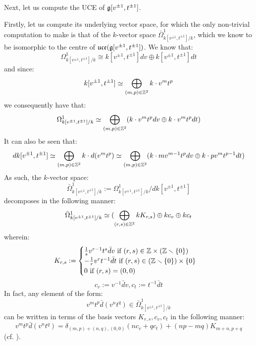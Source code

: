         \begin{example} \label{example: toroidal_lie_algebras_centres}
            Next, let us compute the UCE of $\mathfrak{g}[v^{\pm 1}, t^{\pm 1}]$. 
            
            Firstly, let us compute its underlying vector space, for which the only non-trivial computation to make is that of the $k$-vector space $\bar{\Omega}^1_{k[v^{\pm 1}, t^{\pm 1}]/k}$, which we know to be isomorphic to the centre of $\mathfrak{uce}(\mathfrak{g}[v^{\pm 1}, t^{\pm 1}])$. We know that:
                $$\Omega^1_{k[v^{\pm 1}, t^{\pm 1}]/k} \cong k[v^{\pm 1}, t^{\pm 1}] dv \oplus k[v^{\pm 1}, t^{\pm 1}] dt$$
            and since:
                $$k[v^{\pm 1}, t^{\pm 1}] \simeq \bigoplus_{(m, p) \in \mathbb{Z}^2} k \cdot v^m t^p$$
            we consequently have that:
                $$\Omega^1_{k[v^{\pm 1}, t^{\pm 1}]/k} \simeq \bigoplus_{(m, p) \in \mathbb{Z}^2} (k \cdot v^m t^p dv \oplus k \cdot v^m t^p dt)$$
            It can also be seen that:
                $$d k[v^{\pm 1}, t^{\pm 1}] \simeq \bigoplus_{(m, p) \in \mathbb{Z}^2} k \cdot d(v^m t^p) \simeq \bigoplus_{(m, p) \in \mathbb{Z}^2} ( k \cdot m v^{m - 1} t^p dv \oplus k \cdot p v^m t^{p - 1} dt )$$
            As such, the $k$-vector space:
                $$\bar{\Omega}^1_{k[v^{\pm 1}, t^{\pm 1}]/k} := \Omega^1_{k[v^{\pm 1}, t^{\pm 1}]/k}/d k[v^{\pm 1}, t^{\pm 1}]$$
            decomposes in the following manner:
                $$\bar{\Omega}^1_{k[v^{\pm 1}, t^{\pm 1}]/k} \simeq ( \bigoplus_{(r, s) \in \mathbb{Z}^2} k K_{r, s}) \oplus k c_v \oplus k c_t$$
            wherein:
                $$
                    K_{r, s} :=
                    \begin{cases}
                        \text{$\frac1s v^{r - 1} t^s \bar{d}v$ if $(r, s) \in \Z \x (\Z \setminus \{0\})$}
                        \\
                        \text{$-\frac1r v^r t^{-1} \bar{d}t$ if $(r, s) \in (\Z \setminus \{0\}) \x \{0\}$}
                        \\
                        \text{$0$ if $(r, s) = (0, 0)$}
                    \end{cases}
                $$
                $$c_v := v^{-1} \bar{d}v, c_t := t^{-1} \bar{d}t$$
            In fact, any element of the form:
                $$v^m t^p \bar{d}(v^n t^q) \in \bar{\Omega}^1_{k[v^{\pm 1}, t^{\pm 1}]/k}$$
            can be written in terms of the basis vectors $K_{r, s}, c_v, c_t$ in the following manner:
                $$v^m t^p \bar{d}(v^n t^q) = \delta_{(m, p) + (n, q), (0, 0)} ( n c_v + q c_t ) + (np - mq) K_{m + n, p + q}$$
            (cf. \cite[pp. 35]{wendlandt_formal_shift_operators_on_yangian_doubles}).


\end{example}
